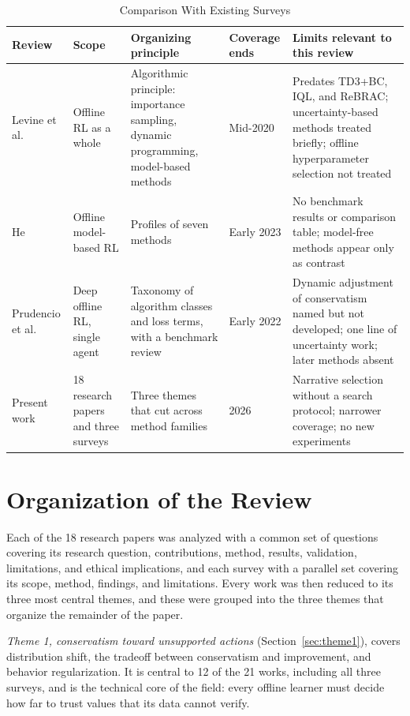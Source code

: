 \documentclass[conference]{IEEEtran}
\begin{document}
\begin{table}[!t]
\caption{Comparison With Existing Surveys}
\label{tab:surveys}
\centering
\footnotesize
\renewcommand{\arraystretch}{1.2}
\begin{tabularx}{\textwidth}{@{}P{0.13\textwidth}P{0.17\textwidth}LP{0.09\textwidth}L@{}}
\toprule
Review & Scope & Organizing principle & Coverage ends & Limits relevant to this review \\
\midrule
Levine et al. \cite{levine2020tutorial} & Offline RL as a whole & Algorithmic principle: importance sampling, dynamic programming, model-based methods & Mid-2020 & Predates TD3+BC, IQL, and ReBRAC; uncertainty-based methods treated briefly; offline hyperparameter selection not treated \\
He \cite{he2023survey} & Offline model-based RL & Profiles of seven methods & Early 2023 & No benchmark results or comparison table; model-free methods appear only as contrast \\
Prudencio et al. \cite{prudencio2024survey} & Deep offline RL, single agent & Taxonomy of algorithm classes and loss terms, with a benchmark review & Early 2022 & Dynamic adjustment of conservatism named but not developed; one line of uncertainty work; later methods absent \\
Present work & 18 research papers and three surveys & Three themes that cut across method families & 2026 & Narrative selection without a search protocol; narrower coverage; no new experiments \\
\bottomrule
\end{tabularx}
\end{table}

\section{Organization of the Review}
\label{sec:organization}
Each of the 18 research papers was analyzed with a common set of questions covering its research question, contributions, method, results, validation, limitations, and ethical implications, and each survey with a parallel set covering its scope, method, findings, and limitations. Every work was then reduced to its three most central themes, and these were grouped into the three themes that organize the remainder of the paper.

\emph{Theme 1, conservatism toward unsupported actions} (Section~\ref{sec:theme1}), covers distribution shift, the tradeoff between conservatism and improvement, and behavior regularization. It is central to 12 of the 21 works, including all three surveys, and is the technical core of the field: every offline learner must decide how far to trust values that its data cannot verify.
\end{document}
